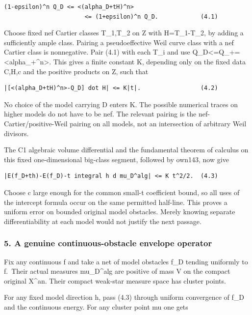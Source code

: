 \documentclass[
  10pt,
]{article}
\begin{document}
\begin{verbatim}
(1-epsilon)^n Q_D <= <(alpha_D+tH)^n>
                       <= (1+epsilon)^n Q_D.            (4.1)
\end{verbatim}

Choose fixed nef Cartier classes T\_1,T\_2 on Z with H=T\_1-T\_2, by
adding a sufficiently ample class. Pairing a pseudoeffective Weil curve
class with a nef Cartier class is nonnegative. Pair (4.1) with each T\_i
and use Q\_D\textless=Q\_+=\textless alpha\_+\^{}n\textgreater. This
gives a finite constant K, depending only on the fixed data C,H,c and
the positive products on Z, such that

\begin{verbatim}
|[<(alpha_D+tH)^n>-Q_D] dot H| <= K|t|.                 (4.2)
\end{verbatim}

No choice of the model carrying D enters K. The possible numerical
traces on higher models do not have to be nef. The relevant pairing is
the nef-Cartier/positive-Weil pairing on all models, not an intersection
of arbitrary Weil divisors.

The C1 algebraic volume differential and the fundamental theorem of
calculus on this fixed one-dimensional big-class segment, followed by
own143, now give

\begin{verbatim}
|E(f_D+th)-E(f_D)-t integral h d mu_D^alg| <= K t^2/2.  (4.3)
\end{verbatim}

Choose c large enough for the common small-t coefficient bound, so all
uses of the intercept formula occur on the same permitted half-line.
This proves a uniform error on bounded original model obstacles. Merely
knowing separate differentiability at each model would not justify the
next passage.

\subsubsection{5. A genuine continuous-obstacle envelope
operator}\label{a-genuine-continuous-obstacle-envelope-operator}

Fix any continuous f and take a net of model obstacles f\_D tending
uniformly to f.~Their actual measures mu\_D\^{}alg are positive of mass
V on the compact original X\^{}an. Their compact weak-star measure space
has cluster points.

For any fixed model direction h, pass (4.3) through uniform convergence
of f\_D and the continuous energy. For any cluster point mu one gets
\end{document}
